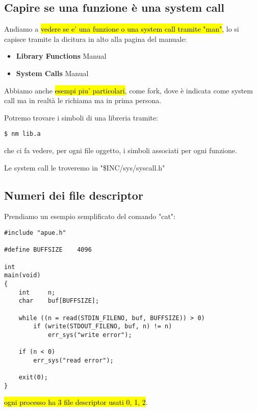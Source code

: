 \subsection{Capire se una funzione è una system call}

Andiamo a \hl{vedere se e' una funzione o una system call tramite "man"}, lo si capisce tramite la dicitura in alto alla pagina del manuale:

	\begin{itemize}
		\item \textbf{Library Functions} Manual
		\item \textbf{System Calls} Manual
	\end{itemize}

Abbiamo anche \hl{esempi piu' particolari}, come fork, dove è indicata come system call ma in realtà le richiama ma in prima persona.


Potremo trovare i simboli di una libreria tramite:

\begin{lstlisting}
$ nm lib.a
\end{lstlisting}

che ci fa vedere, per ogni file oggetto, i simboli associati per ogni funzione.

Le system call le troveremo in "\$INC/sys/syscall.h"


\subsection{Numeri dei file descriptor}

Prendiamo un esempio semplificato del comando "cat":

\begin{lstlisting}
#include "apue.h"

#define	BUFFSIZE	4096

int
main(void)
{
	int		n;
	char	buf[BUFFSIZE];

	while ((n = read(STDIN_FILENO, buf, BUFFSIZE)) > 0)
		if (write(STDOUT_FILENO, buf, n) != n)
			err_sys("write error");

	if (n < 0)
		err_sys("read error");

	exit(0);
}
\end{lstlisting}

\hl{ogni processo ha 3 file descriptor usati 0, 1, 2}.

